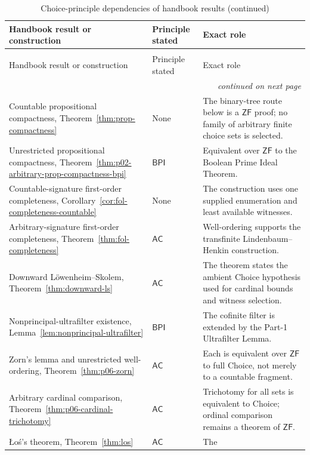 \begingroup\small
\begin{longtable}{@{}p{}p{}p{}@{}}
\caption{Choice-principle dependencies of handbook results.}
\label{tab:p06-choice-dependencies}\\
\toprule
Handbook result or construction & Principle stated & Exact role \\
\midrule
\endfirsthead
\caption[]{Choice-principle dependencies of handbook results (continued)}\\
\toprule
Handbook result or construction & Principle stated & Exact role \\
\midrule
\endhead
\midrule\multicolumn{3}{r}{\emph{continued on next page}}\\
\endfoot
\endlastfoot
Countable propositional compactness,
Theorem~\ref{thm:prop-compactness} & None & The binary-tree route below is a
\(\mathsf{ZF}\) proof; no family of arbitrary finite choice sets is selected. \\
Unrestricted propositional compactness,
Theorem~\ref{thm:p02-arbitrary-prop-compactness-bpi} & \(\mathsf{BPI}\) &
Equivalent over \(\mathsf{ZF}\) to the Boolean Prime Ideal Theorem. \\
Countable-signature first-order completeness,
Corollary~\ref{cor:fol-completeness-countable} & None & The construction
uses one supplied enumeration and least available witnesses. \\
Arbitrary-signature first-order completeness,
Theorem~\ref{thm:fol-completeness} & \(\mathsf{AC}\) & Well-ordering
supports the transfinite Lindenbaum--Henkin construction. \\
Downward L\"owenheim--Skolem,
Theorem~\ref{thm:downward-ls} & \(\mathsf{AC}\) & The theorem states the
ambient Choice hypothesis used for cardinal bounds and witness selection. \\
Nonprincipal-ultrafilter existence,
Lemma~\ref{lem:nonprincipal-ultrafilter} & \(\mathsf{BPI}\) & The
cofinite filter is extended by the Part-1 Ultrafilter Lemma. \\
Zorn's lemma and unrestricted well-ordering,
Theorem~\ref{thm:p06-zorn} & \(\mathsf{AC}\) & Each is equivalent over
\(\mathsf{ZF}\) to full Choice, not merely to a countable fragment. \\
Arbitrary cardinal comparison,
Theorem~\ref{thm:p06-cardinal-trichotomy} & \(\mathsf{AC}\) & Trichotomy for
all sets is equivalent to Choice; ordinal comparison remains a theorem of
\(\mathsf{ZF}\). \\
\L o\'s's theorem, Theorem~\ref{thm:los} & \(\mathsf{AC}\) & The

\end{longtable}
